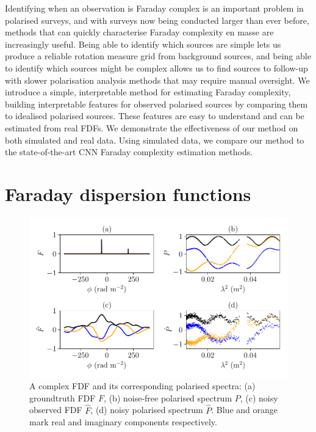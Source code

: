   Identifying when an observation is Faraday complex is an important problem in polarised surveys, and with surveys now being conducted larger than ever before, methods that can quickly characterise Faraday complexity en masse are increasingly useful. Being able to identify which sources are simple lets us produce a reliable rotation measure grid from background sources, and being able to identify which sources might be complex allows us to find sources to follow-up with slower polarisation analysis methods that may require manual oversight. We introduce a simple, interpretable method for estimating Faraday complexity, building interpretable features for observed polarised sources by comparing them to idealised polarised sources. These features are easy to understand and can be estimated from real FDFs. We demonstrate the effectiveness of our method on both simulated and real data. Using simulated data, we compare our method to the state-of-the-art CNN Faraday complexity estimation methods.

\section{Faraday dispersion functions}

  \begin{figure}
    \includegraphics[width=\linewidth]{faraday-images/spectra.pdf}
    \caption{A complex FDF and its corresponding polarised spectra: (a) groundtruth FDF $F$, (b) noise-free polarised spectrum $P$, (c) noisy observed FDF $\hat F$, (d) noisy polarised spectrum $\hat P$. Blue and orange mark real and imaginary components respectively.}
  \end{figure}

